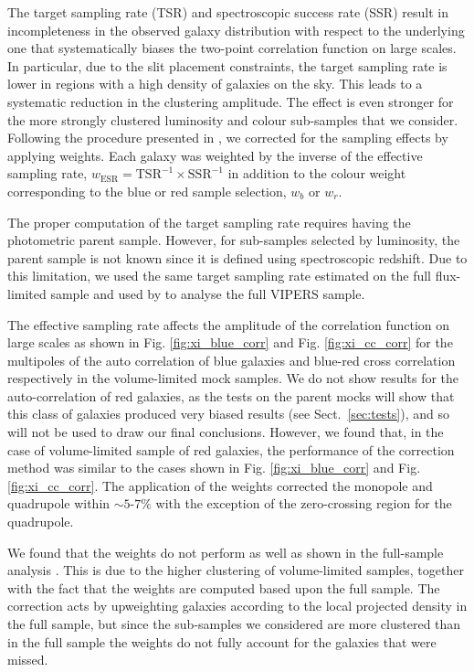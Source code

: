 \documentclass[longauth]{aa}
\begin{document}
The target sampling rate (TSR) and spectroscopic success rate (SSR) result in incompleteness in the observed galaxy distribution with respect to the underlying one that systematically biases the two-point correlation function on large scales.  In particular, due to the slit placement constraints, the target sampling rate is lower in regions with a high density of galaxies on the sky.  This leads to a systematic reduction in the clustering amplitude.  The effect is even stronger for the more strongly clustered luminosity and colour sub-samples that we consider. Following the procedure presented in \citet{delatorre13a}, we corrected for the sampling effects by applying weights.  Each galaxy was weighted by the inverse of the effective sampling rate, $w_{\mathrm{ESR}}={\mathrm{TSR}}^{-1}\times {\mathrm{SSR}}^{-1}$ in addition to the colour weight corresponding to the blue or red sample selection,  $w_{b}$ or $w_r$.

The proper computation of the target sampling rate requires having the photometric parent sample. However, for sub-samples selected by luminosity, the parent sample is not known since it is defined using spectroscopic redshift.  Due to this limitation, we used the same target sampling rate estimated on the full flux-limited sample and used by \citet{pezzotta16} to analyse the full VIPERS sample.

The effective sampling rate affects the amplitude of the correlation function on large scales as shown in Fig. \ref{fig:xi_blue_corr} and Fig. \ref{fig:xi_cc_corr} for the multipoles of the auto correlation of blue galaxies and blue-red cross correlation respectively in the volume-limited mock samples. We do not show results for the auto-correlation of red galaxies, as the tests on the parent mocks will show that this class of galaxies produced very biased results (see Sect.~\ref{sec:tests}), and so will not be used to draw our final conclusions. However, we found that, in the case of volume-limited sample of red galaxies, the performance of the correction method was similar to the cases shown in Fig. \ref{fig:xi_blue_corr} and Fig. \ref{fig:xi_cc_corr}. The application of the weights corrected the monopole and quadrupole within $\sim5\text{-}7\%$ with the  exception of the zero-crossing region for the quadrupole.  

We found that the weights do not perform as well as shown in the full-sample analysis \citep{pezzotta16}.  This is due to the higher clustering of volume-limited samples, together with the fact that the weights are computed based upon the full sample.  The correction acts by upweighting galaxies according to the local projected density in the full sample, but since the sub-samples we considered are more clustered than in the full sample the weights do not fully account for the galaxies that were missed.
\end{document}
